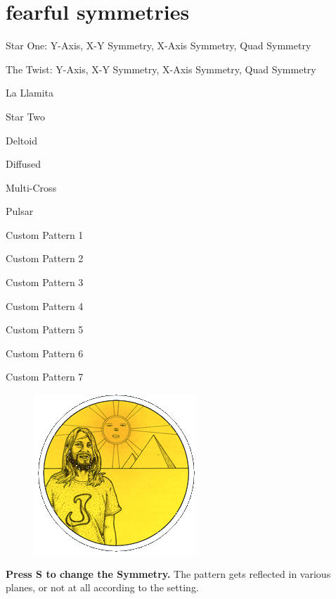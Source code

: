 \chapter{fearful symmetries} 
\label{sec:symmetries}
\rhead[]{\leftmark}
\lstset{style=6502Style}
\lstset{ 
   aboveskip=5pt,
   belowskip=0pt,
}

\newcommand\addItem[2]%
{
  \expandafter\def\csname row:#1\endcsname{#2}%
}

\newcommand\showItem[1]%
{\expandafter\csname row:#1\endcsname}


\newcommand\getItem[1]%
{\noindent
  \text{\showItem{#1}}
  \par
}
\addItem{0}{Star One: Y-Axis, X-Y Symmetry, X-Axis Symmetry, Quad Symmetry}
\addItem{1}{The Twist: Y-Axis, X-Y Symmetry, X-Axis Symmetry, Quad Symmetry}
\addItem{2}{La Llamita}
\addItem{3}{Star Two}
\addItem{4}{Deltoid}
\addItem{5}{Diffused}
\addItem{6}{Multi-Cross}
\addItem{7}{Pulsar}
\addItem{8}{Custom Pattern 1}
\addItem{9}{Custom Pattern 2}
\addItem{10}{Custom Pattern 3}
\addItem{11}{Custom Pattern 4}
\addItem{12}{Custom Pattern 5}
\addItem{13}{Custom Pattern 6}
\addItem{14}{Custom Pattern 7}

\begin{definition}
\setlength{\intextsep}{0pt}%
\setlength{\columnsep}{3pt}%
\begin{figure}
\includegraphics[width=\linewidth]{src/callout/psych.png} 
\end{figure}
\small
\textbf{Press S to change the Symmetry.} The pattern gets reflected in various planes, or not at all according to the setting.
\\
\\
\end{definition}

